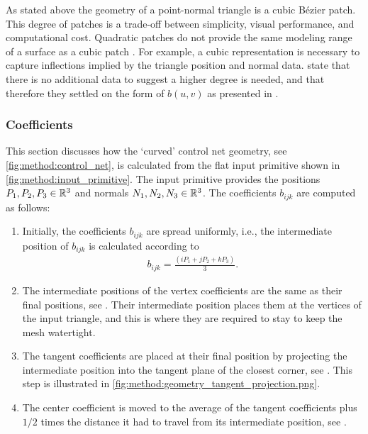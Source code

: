 	As stated above the geometry of a point-normal triangle is a cubic Bézier patch. This degree of patches is a trade-off between simplicity, visual performance, and computational cost. Quadratic patches do not provide the same modeling range of a surface as a cubic patch \cite{boubekeur2008phong}. For example, a cubic representation is necessary to capture inflections implied by the triangle position and normal data. \citeauthor{vlachos2001curved} state that there is no additional data to suggest a higher degree is needed, and that therefore they settled on the form of $b(u,v)$ as presented in .

\subsubsection{Coefficients} 
\label{sss:method:geometry:construction}
	This section discusses how the `curved' control net geometry, see \cref{fig:method:control_net}, is calculated from the flat input primitive shown in \cref{fig:method:input_primitive}. The input primitive provides the positions $P_1, P_2, P_3 \in \mathbb{R}^3$ and normals $N_1, N_2, N_3 \in \mathbb{R}^3$. The coefficients $b_{ijk}$ are computed as follows:
	\begin{enumerate}[label=(\roman*)]
		\item 
			Initially, the coefficients $b_{ijk}$ are spread uniformly, i.e., the intermediate position of $b_{ijk}$ is calculated according to
			\begin{align*}
				b_{ijk} = \frac{(i P_1 + j P_2 + k P_3)}{3}.
			\end{align*}
		\item 
			The intermediate positions of the vertex coefficients are the same as their final positions, see . Their intermediate position places them at the vertices of the input triangle, and this is where they are required to stay to keep the mesh watertight.
		\item 
			The tangent coefficients are placed at their final position by projecting the intermediate position into the tangent plane of the closest corner, see . This step is illustrated in \cref{fig:method:geometry_tangent_projection.png}.
		\item The center coefficient is moved to the average of the tangent coefficients plus $1/2$ times the distance it had to travel from its intermediate position, see .
	\end{enumerate}
